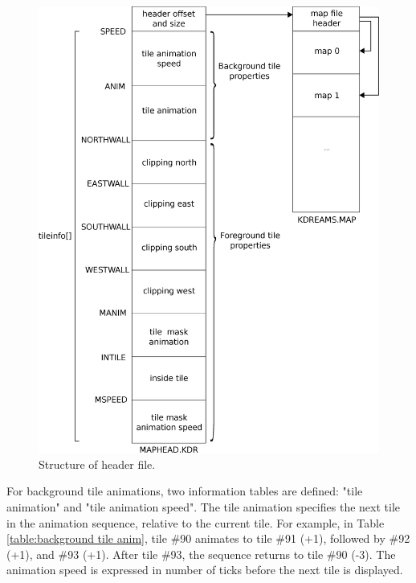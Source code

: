 \documentclass[book.tex]{subfiles}
\begin{document}
 
\begin{figure}[H]
\centering
 \includegraphics[width=1.0\textwidth]{imgs/drawings/map_header.eps}
 \caption{Structure of  header file.}
 \label{fig:map-header-file}
\end{figure}
\par 
For background tile animations, two information tables are defined: "tile animation" and "tile animation speed". The tile animation specifies the next tile in the animation sequence, relative to the current tile. For example, in Table \ref{table:background tile anim}, tile \#90 animates to tile \#91 (+1), followed by \#92 (+1), and \#93 (+1). After tile \#93, the sequence returns to tile \#90 (-3). The animation speed is expressed in number of ticks before the next tile is displayed. \\
\end{document}
